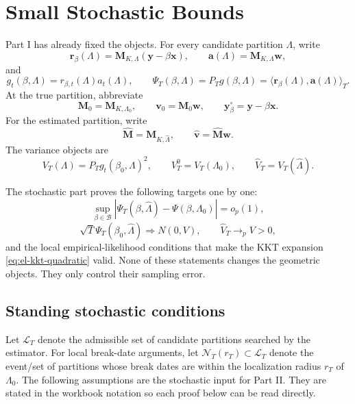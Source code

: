 \documentclass[12pt]{article}
\numberwithin{equation}{section}
\theoremstyle{definition}
\newcommand{\op}{o_p}
\newcommand{\innerT}[2]{\langle #1,#2\rangle_T}
\begin{document}
\section{Small Stochastic Bounds}

Part I has already fixed the objects. For every candidate partition \(\Lambda\),
write
\[
    \bm r_\beta(\Lambda)=\bm M_{K,\Lambda}(\bm y-\beta\bm x),
    \qquad
    \bm a(\Lambda)=\bm M_{K,\Lambda}\bm w,
\]
and
\[
    g_t(\beta,\Lambda)=r_{\beta,t}(\Lambda)a_t(\Lambda),
    \qquad
    \Psi_T(\beta,\Lambda)=P_Tg(\beta,\Lambda)
    =\innerT{\bm r_\beta(\Lambda)}{\bm a(\Lambda)}.
\]
At the true partition, abbreviate
\[
    \bm M_0=\bm M_{K,\Lambda_0},
    \qquad
    \bm v_0=\bm M_0\bm w,
    \qquad
    \bm y_\beta^\circ=\bm y-\beta\bm x.
\]
For the estimated partition, write
\[
    \widehat{\bm M}=\bm M_{K,\widehat\Lambda},
    \qquad
    \widehat{\bm v}=\widehat{\bm M}\bm w.
\]
The variance objects are
\[
    V_T(\Lambda)=P_Tg_t(\beta_0,\Lambda)^2,
    \qquad
    V_T^0=V_T(\Lambda_0),
    \qquad
    \widehat V_T=V_T(\widehat\Lambda).
\]

The stochastic part proves the following targets one by one:
\begin{equation}
    \sup_{\beta\in\mathcal B}
    |\Psi_T(\beta,\widehat\Lambda)-\Psi(\beta,\Lambda_0)|=\op(1),
    \label{eq:uniform-bridge}
\end{equation}
\[
    \sqrt T\Psi_T(\beta_0,\widehat\Lambda)\Rightarrow N(0,V),
    \qquad
    \widehat V_T\to_p V>0,
\]
and the local empirical-likelihood conditions that make the KKT expansion
\eqref{eq:el-kkt-quadratic} valid. None of these statements changes the
geometric objects. They only control their sampling error.

\subsection{Standing stochastic conditions}

Let \(\mathcal L_T\) denote the admissible set of candidate partitions searched
by the estimator. For local break-date arguments, let
\(\mathcal N_T(r_T)\subset\mathcal L_T\) denote the event/set of partitions whose
break dates are within the localization radius \(r_T\) of \(\Lambda_0\). The
following assumptions are the stochastic input for Part II. They are stated in
the workbook notation so each proof below can be read directly.
\end{document}
